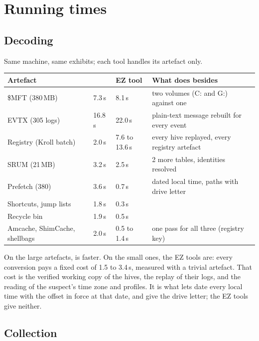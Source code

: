 \documentclass[11pt,a4paper,oneside]{report}
\begin{document}
\chapter{Running times}

\section{Decoding}

Same machine, same exhibits; each tool handles its artefact only.

\begin{longtable}{@{}L{3.6cm}L{2.2cm}L{2.2cm}L{7.0cm}@{}}
\toprule
\textbf{Artefact} & \textbf{\wac{}} & \textbf{EZ tool} & \textbf{What \wac{} does besides} \\
\midrule\endhead
\$MFT (380\,MB) & 7.3\,s & 8.1\,s & two volumes (C: and G:) against one \\
EVTX (305 logs) & 16.8\,s & 22.0\,s & plain-text message rebuilt for every event \\
Registry (Kroll batch) & 2.0\,s & 7.6 to 13.6\,s & every hive replayed, every registry artefact \\
SRUM (21\,MB) & 3.2\,s & 2.5\,s & 2 more tables, identities resolved \\
Prefetch (380) & 3.6\,s & 0.7\,s & dated local time, paths with drive letter \\
Shortcuts, jump lists & 1.8\,s & 0.3\,s & \\
Recycle bin & 1.9\,s & 0.5\,s & \\
Amcache, ShimCache, shellbags & 2.0\,s & 0.5 to 1.4\,s & one pass for all three (registry key) \\
\bottomrule
\end{longtable}

On the large artefacts, \wac{} is faster. On the small ones, the EZ tools are:
every \wac{} conversion pays a fixed cost of 1.5 to 3.4\,s, measured with a
trivial artefact. That cost is the verified working copy of the hives, the
replay of their logs, and the reading of the suspect's time zone and profiles.
It is what lets \wac{} date every local time with the offset in force at that
date, and give the drive letter; the EZ tools give neither.

\section{Collection}
\end{document}
